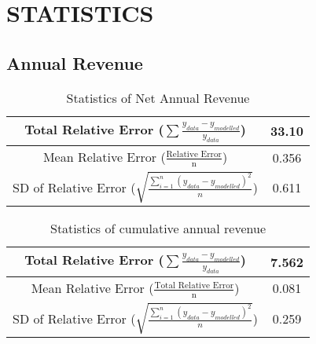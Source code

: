 \documentclass[aps,twocolumn,10pt,reprint]{revtex4}
\begin{document}
\newpage

\section{STATISTICS}
\subsection{Annual Revenue}
\renewcommand{\arraystretch}{2.5}
\begin{table}[!h]
\centering
\begin{tabular}{|c | c|}
\hline
Total Relative Error ($\sum\frac{y_{data} - y_{modelled}}{y_{data}}$) & 33.10 \\
\hline
Mean Relative Error ($\frac{\text{Relative Error}}{\text{n}}$) & 0.356 \\
\hline
SD of Relative Error ($\sqrt{\frac{\sum_{i=1}^{n} (y_{data} - y_{modelled})^2}{n}}$) & 0.611 \\
\hline 
\end{tabular}
\caption{Statistics of Net Annual Revenue}
\label{table:statistics}
\end{table}

\renewcommand{\arraystretch}{2.5}
\begin{table}[!h]
\centering
\begin{tabular}{|c | c|}
\hline
Total Relative Error ($\sum \frac{y_{data} - y_{modelled}}{y_{data}}$) & 7.562 \\
\hline
Mean Relative Error ($\frac{\text{Total Relative Error}}{\text{n}}$) & 0.081 \\ 
\hline
SD of Relative Error ($\sqrt{\frac{\sum_{i=1}^{n} (y_{data} - y_{modelled})^2}{n}}$) & 0.259 \\
\hline
\end{tabular}
\caption{Statistics of cumulative annual revenue}
\label{table:statistics2}
\end{table}
\end{document}

